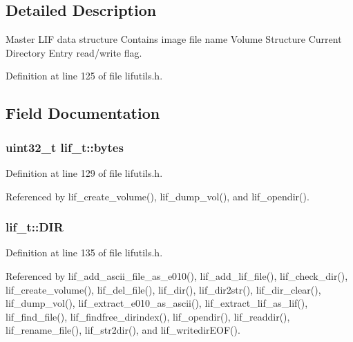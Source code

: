 \subsection{Detailed Description}
Master L\+IF data structure Contains image file name Volume Structure Current Directory Entry read/write flag. 

Definition at line 125 of file lifutils.\+h.



\subsection{Field Documentation}
\subsubsection[{\texorpdfstring{bytes}{bytes}}]{\setlength{\rightskip}{0pt plus 5cm}uint32\+\_\+t lif\+\_\+t\+::bytes}\hypertarget{structlif__t_a46964ae5e810fad047ead39465e9514c}{}\label{structlif__t_a46964ae5e810fad047ead39465e9514c}


Definition at line 129 of file lifutils.\+h.



Referenced by lif\+\_\+create\+\_\+volume(), lif\+\_\+dump\+\_\+vol(), and lif\+\_\+opendir().

\subsubsection[{\texorpdfstring{D\+IR}{DIR}}]{ lif\+\_\+t\+::\+D\+IR}\hypertarget{structlif__t_aefeaa526c04a2b8715b0392feeec52a3}{}\label{structlif__t_aefeaa526c04a2b8715b0392feeec52a3}


Definition at line 135 of file lifutils.\+h.



Referenced by lif\+\_\+add\+\_\+ascii\+\_\+file\+\_\+as\+\_\+e010(), lif\+\_\+add\+\_\+lif\+\_\+file(), lif\+\_\+check\+\_\+dir(), lif\+\_\+create\+\_\+volume(), lif\+\_\+del\+\_\+file(), lif\+\_\+dir(), lif\+\_\+dir2str(), lif\+\_\+dir\+\_\+clear(), lif\+\_\+dump\+\_\+vol(), lif\+\_\+extract\+\_\+e010\+\_\+as\+\_\+ascii(), lif\+\_\+extract\+\_\+lif\+\_\+as\+\_\+lif(), lif\+\_\+find\+\_\+file(), lif\+\_\+findfree\+\_\+dirindex(), lif\+\_\+opendir(), lif\+\_\+readdir(), lif\+\_\+rename\+\_\+file(), lif\+\_\+str2dir(), and lif\+\_\+writedir\+E\+O\+F().

